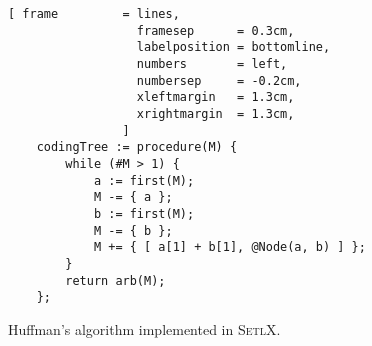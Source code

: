 \begin{figure}[!ht]
\centering
\begin{Verbatim}[ frame         = lines, 
                  framesep      = 0.3cm, 
                  labelposition = bottomline,
                  numbers       = left,
                  numbersep     = -0.2cm,
                  xleftmargin   = 1.3cm,
                  xrightmargin  = 1.3cm,
                ]
    codingTree := procedure(M) {
        while (#M > 1) {
            a := first(M);
            M -= { a };
            b := first(M);
            M -= { b };
            M += { [ a[1] + b[1], @Node(a, b) ] };
        }
        return arb(M);
    };
\end{Verbatim}
\vspace*{-0.3cm}
\caption{Huffman's algorithm implemented in \textsc{SetlX}.}
\label{fig:huffman.stlx}
\end{figure} 

